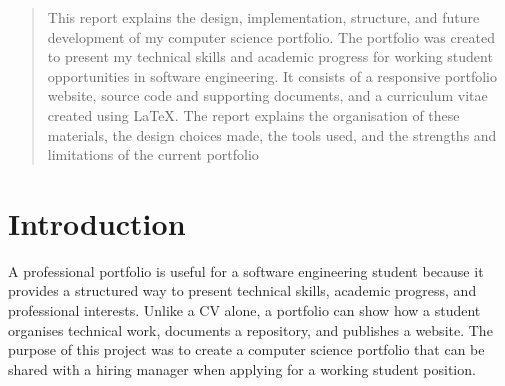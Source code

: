 \documentclass[12pt, a4paper]{article}
\begin{document}
\begin{titlepage}
  \centering
  \vspace*{2cm}

  {\LARGE \textbf{Computer Science Portfolio Report} \par}
  \vspace{1.2cm}
  

  \vspace{2cm}
  {\large Aiwyn Abraham Anish \par}
  {\normalsize Student ID: GH1057600 \par}

  \vspace{1cm}
  {\normalsize \\
  Gisma University Of Applied Sciences\par}

  \vspace{1cm}

  25 June 2026\par}


\end{titlepage}

\newpage
\begin{abstract}
  \noindent
  This report explains the design, implementation, structure, and future development of
my computer science portfolio. The portfolio was created to present my technical skills and
academic progress for working student opportunities in software engineering. It consists of a
responsive portfolio website, source code and supporting documents, and a curriculum vitae
created using LaTeX. The report explains the organisation of these materials, the design
choices made, the tools used, and the strengths and limitations of the current portfolio
\end{abstract}

\vspace{1em}


\newpage
\tableofcontents
\newpage

\section{Introduction}

A professional portfolio is useful for a software engineering student because
it provides a structured way to present technical skills, academic progress,
and professional interests. Unlike a CV alone, a portfolio can show how a
student organises technical work, documents a repository, and publishes a
website. The purpose of this project was to create a computer science
portfolio that can be shared with a hiring manager when applying for a working
student position.
\end{document}

